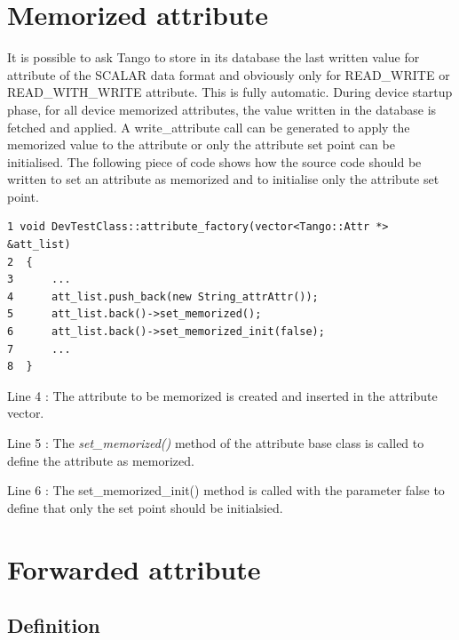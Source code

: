 \section{Memorized attribute}

It is possible to ask Tango to store in its database the last written
value for attribute of the SCALAR data format and obviously only for
READ\_WRITE or READ\_WITH\_WRITE attribute. This is fully automatic.
During device startup phase, for all device memorized
attributes, the value written in the database is fetched and applied.
A write\_attribute call can be generated to apply the memorized value
to the attribute or only the attribute set point can be initialised.
The following piece of code shows how the source code should be written
to set an attribute as memorized and to initialise only the attribute
set point.


\begin{verbatim}
1 void DevTestClass::attribute_factory(vector<Tango::Attr *> &att_list)
2  {
3      ...
4      att_list.push_back(new String_attrAttr());
5      att_list.back()->set_memorized();
6      att_list.back()->set_memorized_init(false);
7      ...
8  }
\end{verbatim}


Line 4 : The attribute to be memorized is created and inserted in
the attribute vector.

Line 5 : The \emph{set\_memorized()} method of the attribute base
class is called to define the attribute as memorized.

Line 6 : The set\_memorized\_init() method is called with the parameter
false to define that only the set point should be initialsied.


\section{Forwarded attribute}


\subsection{Definition}

